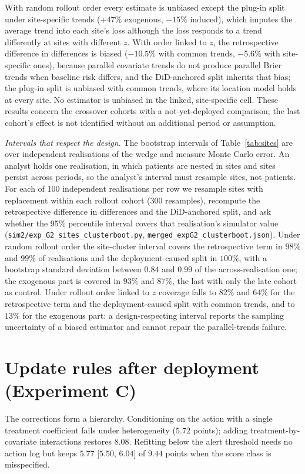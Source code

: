 \documentclass[letterpaper]{article} %
\begin{document}

With random rollout order every estimate is unbiased except the plug-in split
under site-specific trends ($+47\%$ exogenous, $-15\%$ induced), which imputes
the average trend into each site's loss although the loss responds to a trend
differently at sites with different $z$. With order linked to $z$, the
retrospective difference in differences is biased ($-10.5\%$ with common
trends, $-5.6\%$ with site-specific ones), because parallel covariate trends do
not produce parallel Brier trends when baseline risk differs, and the
DiD-anchored split inherits that bias; the plug-in split is unbiased with
common trends, where its location model holds at every site. No estimator is
unbiased in the linked, site-specific cell. These results concern the
crossover cohorts with a not-yet-deployed comparison; the last cohort's effect
is not identified without an additional period or assumption.

\emph{Intervals that respect the design.} The bootstrap intervals of
Table~\ref{tab:sites} are over independent realisations of the wedge and
measure Monte Carlo error. An analyst holds one realisation, in which patients
are nested in sites and sites persist across periods, so the analyst's
interval must resample sites, not patients. For each of 100 independent
realisations per row we resample sites with replacement within each rollout
cohort (300 resamples), recompute the retrospective difference in differences
and the DiD-anchored split, and ask whether the 95\% percentile interval
covers that realisation's simulator value
(\texttt{sim2/exp\_G2\_sites\_clusterboot.py},
\texttt{merged\_expG2\_clusterboot.json}). Under random rollout order the
site-cluster interval covers the retrospective term in $98\%$ and $99\%$ of
realisations and the deployment-caused split in $100\%$, with a bootstrap
standard deviation between $0.84$ and $0.99$ of the across-realisation one;
the exogenous part is covered in $93\%$ and $87\%$, the last with only the
late cohort as control. Under rollout order linked to $z$ coverage falls to
$82\%$ and $64\%$ for the retrospective term and the deployment-caused split
with common trends, and to $13\%$ for the exogenous part: a design-respecting
interval reports the sampling uncertainty of a biased estimator and cannot
repair the parallel-trends failure.

\section{Update rules after deployment (Experiment C)}
\label{app:retrain}
The corrections form a hierarchy. Conditioning on the action with a single
treatment coefficient fails under heterogeneity ($5.72$ points); adding
treatment-by-covariate interactions restores $8.08$. Refitting below the
alert threshold needs no action log but keeps $5.77$ [$5.50$, $6.04$] of
$9.44$ points when the score class is misspecified.
\end{document}
